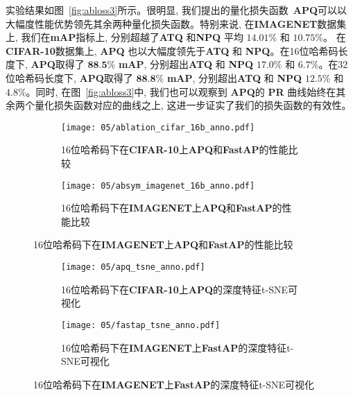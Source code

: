 实验结果如图~\ref{fig:abloss3}所示。很明显, 我们提出的量化损失函数~\textbf{APQ}可以以大幅度性能优势领先其余两种量化损失函数。特别来说, 在\textbf{IMAGENET}数据集上, 我们在\textbf{mAP}指标上, 分别超越了\textbf{ATQ} 和\textbf{NPQ} 平均 \textbf{$14.01$}\% 和 \textbf{$10.75$}\%。 在 \textbf{CIFAR-10}数据集上, \textbf{APQ} 也以大幅度领先于\textbf{ATQ} 和 \textbf{NPQ}。在16位哈希码长度下, \textbf{APQ}取得了 $\textbf{88.5\%}$ \textbf{mAP}, 分别超出\textbf{ATQ} 和 \textbf{NPQ} $17.0\%$ 和 $6.7 \%$。在32位哈希码长度下, \textbf{APQ}取得了 $\textbf{88.8\%}$ \textbf{mAP}, 分别超出\textbf{ATQ} 和 \textbf{NPQ} $12.5\%$ 和 $4.8 \%$。同时, 在图~\ref{fig:abloss3}中, 我们也可以观察到 \textbf{APQ}的 \textbf{PR} 曲线始终在其余两个量化损失函数对应的曲线之上, 这进一步证实了我们的损失函数的有效性。\par
\begin{figure}[!htp]
  \centering
  \begin{subfigure}{0.45\textwidth}
    \centering
    \texttt{[image: 05/ablation\_cifar\_16b\_anno.pdf]}
    \caption{16位哈希码下在\textbf{CIFAR-10}上\textbf{APQ}和\textbf{FastAP}的性能比较}
  \end{subfigure}
  \hspace{1cm}
  \begin{subfigure}{0.45\textwidth}
    \centering
    \texttt{[image: 05/absym\_imagenet\_16b\_anno.pdf]}
    \caption{16位哈希码下在\textbf{IMAGENET}上\textbf{APQ}和\textbf{FastAP}的性能比较}
  \end{subfigure}
  \hspace{1cm}
  \label{fig:abapfast}
\end{figure}

\begin{figure}[!htp]
  \centering
  \begin{subfigure}{0.45\textwidth}
    \centering
    \texttt{[image: 05/apq\_tsne\_anno.pdf]}
    \caption{16位哈希码下在\textbf{CIFAR-10}上\textbf{APQ}的深度特征t-SNE可视化}
  \end{subfigure}
  \hspace{1cm}
  \begin{subfigure}{0.45\textwidth}
    \centering
    \texttt{[image: 05/fastap\_tsne\_anno.pdf]}
    \caption{16位哈希码下在\textbf{IMAGENET}上\textbf{FastAP}的深度特征t-SNE可视化}
  \end{subfigure}
  \label{fig:abapfast1}
\end{figure}


